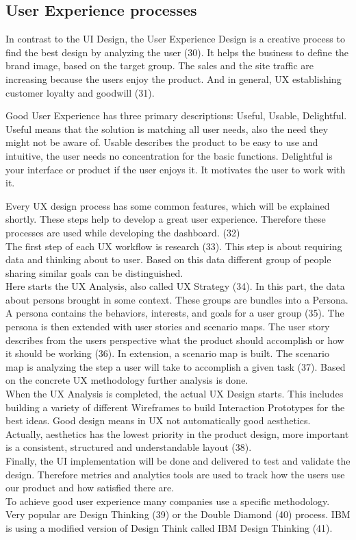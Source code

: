 \documentclass[american,a4paper,oneside,,tablecaptionabove]{scrbook}
\begin{document}
\subsection{User Experience processes}\label{user-experience-processes}

In contrast to the UI Design, the User Experience Design is a creative
process to find the best design by analyzing the user (30). It helps the
business to define the brand image, based on the target group. The sales
and the site traffic are increasing because the users enjoy the product.
And in general, UX establishing customer loyalty and goodwill (31).

Good User Experience has three primary descriptions: Useful, Usable,
Delightful. Useful means that the solution is matching all user needs,
also the need they might not be aware of. Usable describes the product
to be easy to use and intuitive, the user needs no concentration for the
basic functions. Delightful is your interface or product if the user
enjoys it. It motivates the user to work with it.

Every UX design process has some common features, which will be
explained shortly. These steps help to develop a great user experience.
Therefore these processes are used while developing the dashboard.
(32)\\
The first step of each UX workflow is research (33). This step is about
requiring data and thinking about to user. Based on this data different
group of people sharing similar goals can be distinguished.\\
Here starts the UX Analysis, also called UX Strategy (34). In this part,
the data about persons brought in some context. These groups are bundles
into a Persona. A persona contains the behaviors, interests, and goals
for a user group (35). The persona is then extended with user stories
and scenario maps. The user story describes from the users perspective
what the product should accomplish or how it should be working (36). In
extension, a scenario map is built. The scenario map is analyzing the
step a user will take to accomplish a given task (37). Based on the
concrete UX methodology further analysis is done.\\
When the UX Analysis is completed, the actual UX Design starts. This
includes building a variety of different Wireframes to build Interaction
Prototypes for the best ideas. Good design means in UX not automatically
good aesthetics. Actually, aesthetics has the lowest priority in the
product design, more important is a consistent, structured and
understandable layout (38).\\
Finally, the UI implementation will be done and delivered to test and
validate the design. Therefore metrics and analytics tools are used to
track how the users use our product and how satisfied there are.\\
To achieve good user experience many companies use a specific
methodology. Very popular are Design Thinking (39) or the Double Diamond
(40) process. IBM is using a modified version of Design Think called IBM
Design Thinking (41).
\end{document}
